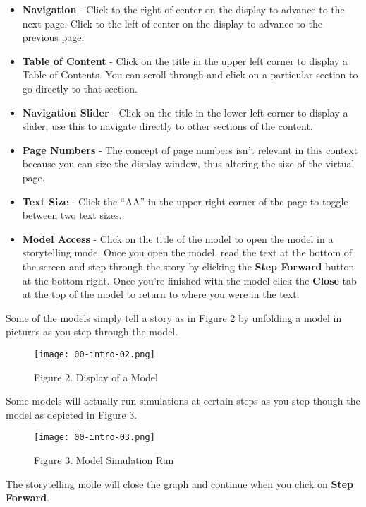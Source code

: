\documentclass[]{memoir}
\let\Oldincludegraphics\includegraphics
\renewcommand{\includegraphics}[1]{\Oldincludegraphics[max size={\textwidth}{\textheight}]{#1}}
\begin{document}
\begin{itemize}
\itemsep1pt\parskip0pt
\item
  \textbf{Navigation} - Click to the right of center on the display to
  advance to the next page. Click to the left of center on the display
  to advance to the previous page.
\item
  \textbf{Table of Content} - Click on the title in the upper left
  corner to display a Table of Contents. You can scroll through and
  click on a particular section to go directly to that section.
\item
  \textbf{Navigation Slider} - Click on the title in the lower left
  corner to display a slider; use this to navigate directly to other
  sections of the content.
\item
  \textbf{Page Numbers} - The concept of page numbers isn't relevant in
  this context because you can size the display window, thus altering
  the size of the virtual page.
\item
  \textbf{Text Size} - Click the ``AA'' in the upper right corner of the
  page to toggle between two text sizes.
\item
  \textbf{Model Access} - Click on the title of the model to open the
  model in a storytelling mode. Once you open the model, read the text
  at the bottom of the screen and step through the story by clicking the
  \textbf{Step Forward} button at the bottom right. Once you're finished
  with the model click the \textbf{Close} tab at the top of the model to
  return to where you were in the text.
\end{itemize}

Some of the models simply tell a story as in Figure 2 by unfolding a
model in pictures as you step through the model.

\begin{figure}[htbp]
\centering
\texttt{[image: 00-intro-02.png]}
\caption{Figure 2. Display of a Model}
\end{figure}

Some models will actually run simulations at certain steps as you step
though the model as depicted in Figure 3.

\begin{figure}[htbp]
\centering
\texttt{[image: 00-intro-03.png]}
\caption{Figure 3. Model Simulation Run}
\end{figure}

The storytelling mode will close the graph and continue when you click
on \textbf{Step Forward}.
\end{document}
